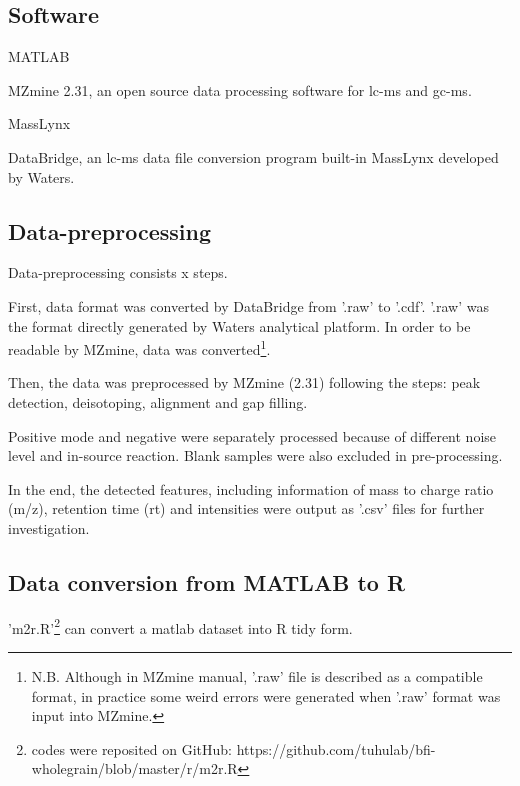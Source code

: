\subsection{Software}
MATLAB

MZmine 2.31, an open source data processing software for \acrshort{lc-ms} and \acrshort{gc-ms}. 

MassLynx

DataBridge, an \acrshort{lc-ms} data file conversion program built-in MassLynx developed by Waters.


\subsection{Data-preprocessing}
Data-preprocessing consists x steps.

First, data format was converted by DataBridge from '.raw' to '.cdf'. '.raw' was the format directly generated by Waters analytical platform. In order to be readable by MZmine, data was converted\footnote{N.B. Although in MZmine manual, '.raw' file is described as a compatible format, in practice some weird errors were generated when '.raw' format was input into MZmine.}.

Then, the data was preprocessed by MZmine (2.31) following the steps: peak detection, deisotoping, alignment and gap filling.

Positive mode and negative were separately processed because of different noise level and in-source reaction. Blank samples were also excluded in pre-processing.

In the end, the detected features, including information of mass to charge ratio (m/z), retention time (rt) and intensities were output as '.csv' files for further investigation.

\subsection{Data conversion from MATLAB to R}
'm2r.R'\footnote{codes were reposited on GitHub: https://github.com/tuhulab/bfi-wholegrain/blob/master/r/m2r.R} can convert a matlab dataset into R tidy form.